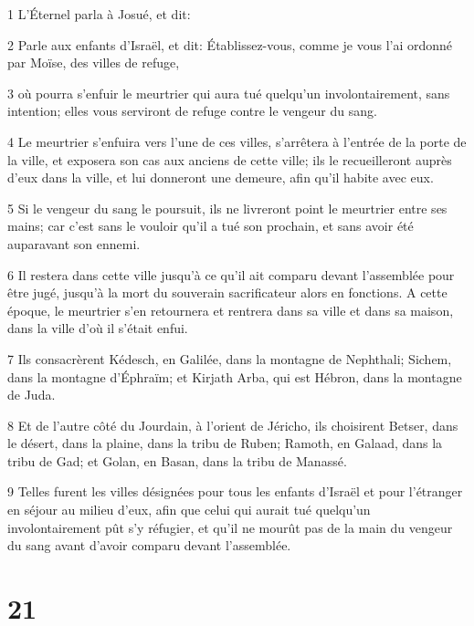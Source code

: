 \par 1 L'Éternel parla à Josué, et dit:
\par 2 Parle aux enfants d'Israël, et dit: Établissez-vous, comme je vous l'ai ordonné par Moïse, des villes de refuge,
\par 3 où pourra s'enfuir le meurtrier qui aura tué quelqu'un involontairement, sans intention; elles vous serviront de refuge contre le vengeur du sang.
\par 4 Le meurtrier s'enfuira vers l'une de ces villes, s'arrêtera à l'entrée de la porte de la ville, et exposera son cas aux anciens de cette ville; ils le recueilleront auprès d'eux dans la ville, et lui donneront une demeure, afin qu'il habite avec eux.
\par 5 Si le vengeur du sang le poursuit, ils ne livreront point le meurtrier entre ses mains; car c'est sans le vouloir qu'il a tué son prochain, et sans avoir été auparavant son ennemi.
\par 6 Il restera dans cette ville jusqu'à ce qu'il ait comparu devant l'assemblée pour être jugé, jusqu'à la mort du souverain sacrificateur alors en fonctions. A cette époque, le meurtrier s'en retournera et rentrera dans sa ville et dans sa maison, dans la ville d'où il s'était enfui.
\par 7 Ils consacrèrent Kédesch, en Galilée, dans la montagne de Nephthali; Sichem, dans la montagne d'Éphraïm; et Kirjath Arba, qui est Hébron, dans la montagne de Juda.
\par 8 Et de l'autre côté du Jourdain, à l'orient de Jéricho, ils choisirent Betser, dans le désert, dans la plaine, dans la tribu de Ruben; Ramoth, en Galaad, dans la tribu de Gad; et Golan, en Basan, dans la tribu de Manassé.
\par 9 Telles furent les villes désignées pour tous les enfants d'Israël et pour l'étranger en séjour au milieu d'eux, afin que celui qui aurait tué quelqu'un involontairement pût s'y réfugier, et qu'il ne mourût pas de la main du vengeur du sang avant d'avoir comparu devant l'assemblée.

\chapter{21}

